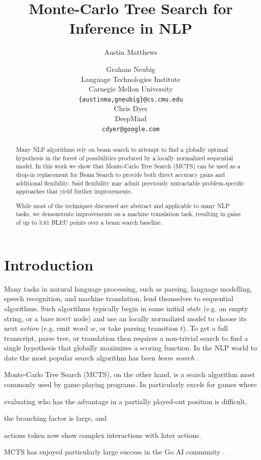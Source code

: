 \documentclass[11pt,a4paper]{article}
\title{Monte-Carlo Tree Search for Inference in NLP}
\author{Austin Matthews \and Graham Neubig \\
  Language Technologies Institute \\
  Carnegie Mellon University \\
  {\tt \{austinma,gneubig\}@cs.cmu.edu} \\\And
  Chris Dyer \\
  DeepMind \\
  {\tt cdyer@google.com} \\}
\date{}
\begin{document}
\maketitle

\begin{abstract}
Many NLP algorithms rely on beam search to attempt to find a globally optimal
hypothesis in the forest of possibilities produced by a locally normalized
sequential model. In this work we show that Monte-Carlo Tree Search (MCTS) can
be used as a drop-in replacement for Beam Search to provide both direct
accuracy gains and additional flexibility. Said flexibility may admit
previously untractable problem-specific approaches that yield further
improvements.

While most of the techniques discussed are abstract and applicable to many NLP
tasks, we demonstrate improvements on a machine translation task, resulting in
gains of up to 3.81 BLEU points over a beam search baseline.
\end{abstract}

\section{Introduction}
\label{sec:intro}
Many tasks in natural language processing, such as parsing, language modelling,
speech recognition, and machine translation, lend themselves to sequential
algorithms. Such algorithms typically begin in some initial \emph{state} (e.g.
an empty string, or a bare \textsc{root} node) and use an locally normalized
model to choose its next \emph{action} (e.g. emit word $w$, or take parsing
transition $t$). To get a full transcript, parse tree, or translation then
requires a non-trivial search to find a single hypothesis that globally
maximizes a scoring function. In the NLP world to date the most popular search
algorithm has been \emph{beam search}
\cite{koehn2004pharaoh,bahdanau2014neural,vinyals2015grammar,
vaswani2017attention}.

Monte-Carlo Tree Search (MCTS), on the other hand, is a search algorithm most
commonly used by game-playing programs. In particularly excels for games where
\begin{enumerate*}[(a)]
\item evaluating who has the advantage in a partially played-out position is
difficult,
\item the branching factor is large, and 
\item actions taken now show complex interactions with later actions.
\end{enumerate*}
MCTS has enjoyed particularly large
success in the Go AI community \cite{abramson1987model, brugmann1993monte,
silver2017mastering}.
\end{document}
